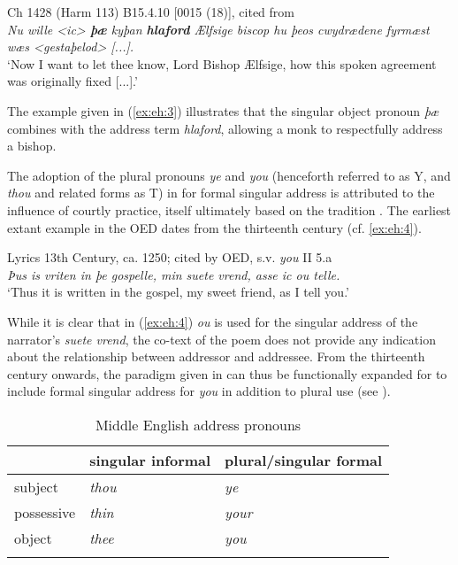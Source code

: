 \documentclass[output=paper,hidelinks]{langscibook}
\begin{document}
\ea \label{ex:eh:3} 
	Ch 1428 (Harm 113) B15.4.10 [0015 (18)], cited from \citet[153]{Kohnen2008}\\
	\textit{Nu wille <ic> \textbf{þæ} kyþan \textbf{hlaford} Ælfsige biscop hu þeos cwydrædene fyrmæst wæs <gestaþelod> [...].}\\
	\enquote*{Now I want to let thee know, Lord Bishop Ælfsige, how this spoken agreement was originally fixed [...].}
\z

The example given in (\ref{ex:eh:3}) illustrates that the singular object pronoun \textit{þæ} combines with the address term \textit{hlaford}, allowing a monk to respectfully address a bishop.

The adoption of the plural pronouns \textit{ye} and \textit{you} (henceforth referred to as Y, and \textit{thou} and related forms as T) in  for formal singular address is attributed to the influence of  courtly practice, itself ultimately based on the  tradition \citep[148]{Lass1999}. The earliest extant example in the OED dates from the thirteenth century (cf. \ref{ex:eh:4}).

\ea \label{ex:eh:4} 
	 Lyrics 13th Century, ca. 1250; cited by OED, s.v. \textit{you} II 5.a\\
	\textit{Þus is vriten in þe gospelle, min suete vrend, asse ic \textit{ou} telle.}\\
	\enquote*{Thus it is written in the gospel, my sweet friend, as I tell you.}\\
\z

While it is clear that in (\ref{ex:eh:4}) \textit{ou} is used for the singular address of the narrator’s \textit{suete vrend}, the co-text of the poem does not provide any indication about the relationship between addressor and addressee.
From the thirteenth century onwards, the paradigm given in  can thus be functionally expanded for  to include formal singular address for \textit{you} in addition to plural use (see ).

\begin{table}
\caption{Middle English address pronouns}\label{tab2elsweiler}
 \begin{tabular}{l ll} 
  \lsptoprule
            & singular informal & plural/singular formal\\ 
  \midrule
  subject     & \itshape thou  & \itshape ye \\
  possessive  & \itshape thin  & \itshape your  \\
  object      & \itshape thee  & \itshape you \\
  \lspbottomrule
 \end{tabular}
\end{table}
\end{document}
